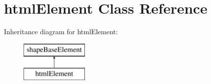 \hypertarget{classhtmlElement}{}\section{html\+Element Class Reference}
\label{classhtmlElement}
Inheritance diagram for html\+Element\+:\begin{figure}[H]
\begin{center}
\leavevmode
\includegraphics[height=2.000000cm]{classhtmlElement}
\end{center}
\end{figure}
